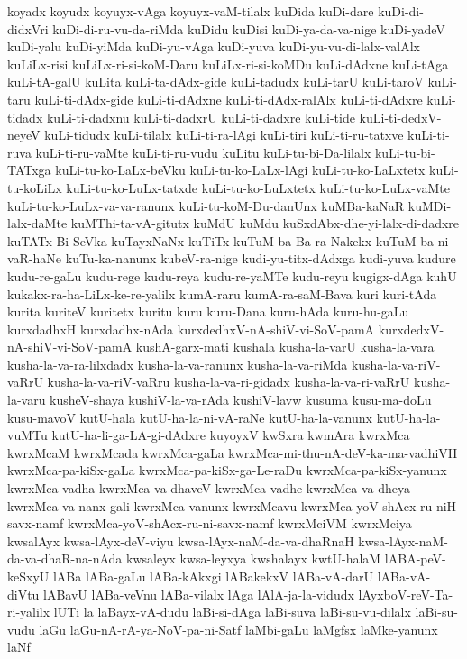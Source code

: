 {koyadx
koyudx
koyuyx-vAga
koyuyx-vaM-tilalx
kuDida
kuDi-dare
kuDi-di-didxVri
kuDi-di-ru-vu-da-riMda
kuDidu
kuDisi
kuDi-ya-da-va-nige
kuDi-yadeV
kuDi-yalu
kuDi-yiMda
kuDi-yu-vAga
kuDi-yuva
kuDi-yu-vu-di-lalx-valAlx
kuLiLx-risi
kuLiLx-ri-si-koM-Daru
kuLiLx-ri-si-koMDu
kuLi-dAdxne
kuLi-tAga
kuLi-tA-galU
kuLita
kuLi-ta-dAdx-gide
kuLi-tadudx
kuLi-tarU
kuLi-taroV
kuLi-taru
kuLi-ti-dAdx-gide
kuLi-ti-dAdxne
kuLi-ti-dAdx-ralAlx
kuLi-ti-dAdxre
kuLi-tidadx
kuLi-ti-dadxnu
kuLi-ti-dadxrU
kuLi-ti-dadxre
kuLi-tide
kuLi-ti-dedxV-neyeV
kuLi-tidudx
kuLi-tilalx
kuLi-ti-ra-lAgi
kuLi-tiri
kuLi-ti-ru-tatxve
kuLi-ti-ruva
kuLi-ti-ru-vaMte
kuLi-ti-ru-vudu
kuLitu
kuLi-tu-bi-Da-lilalx
kuLi-tu-bi-TATxga
kuLi-tu-ko-LaLx-beVku
kuLi-tu-ko-LaLx-lAgi
kuLi-tu-ko-LaLxtetx
kuLi-tu-koLiLx
kuLi-tu-ko-LuLx-tatxde
kuLi-tu-ko-LuLxtetx
kuLi-tu-ko-LuLx-vaMte
kuLi-tu-ko-LuLx-va-va-ranunx
kuLi-tu-koM-Du-danUnx
kuMBa-kaNaR
kuMDi-lalx-daMte
kuMThi-ta-vA-gitutx
kuMdU
kuMdu
kuSxdAbx-dhe-yi-lalx-di-dadxre
kuTATx-Bi-SeVka
kuTayxNaNx
kuTiTx
kuTuM-ba-Ba-ra-Nakekx
kuTuM-ba-ni-vaR-haNe
kuTu-ka-nanunx
kubeV-ra-nige
kudi-yu-titx-dAdxga
kudi-yuva
kudure
kudu-re-gaLu
kudu-rege
kudu-reya
kudu-re-yaMTe
kudu-reyu
kugigx-dAga
kuhU
kukakx-ra-ha-LiLx-ke-re-yalilx
kumA-raru
kumA-ra-saM-Bava
kuri
kuri-tAda
kurita
kuriteV
kuritetx
kuritu
kuru
kuru-Dana
kuru-hAda
kuru-hu-gaLu
kurxdadhxH
kurxdadhx-nAda
kurxdedhxV-nA-shiV-vi-SoV-pamA
kurxdedxV-nA-shiV-vi-SoV-pamA
kushA-garx-mati
kushala
kusha-la-varU
kusha-la-vara
kusha-la-va-ra-lilxdadx
kusha-la-va-ranunx
kusha-la-va-riMda
kusha-la-va-riV-vaRrU
kusha-la-va-riV-vaRru
kusha-la-va-ri-gidadx
kusha-la-va-ri-vaRrU
kusha-la-varu
kusheV-shaya
kushiV-la-va-rAda
kushiV-lavw
kusuma
kusu-ma-doLu
kusu-mavoV
kutU-hala
kutU-ha-la-ni-vA-raNe
kutU-ha-la-vanunx
kutU-ha-la-vuMTu
kutU-ha-li-ga-LA-gi-dAdxre
kuyoyxV
kwSxra
kwmAra
kwrxMca
kwrxMcaM
kwrxMcada
kwrxMca-gaLa
kwrxMca-mi-thu-nA-deV-ka-ma-vadhiVH
kwrxMca-pa-kiSx-gaLa
kwrxMca-pa-kiSx-ga-Le-raDu
kwrxMca-pa-kiSx-yanunx
kwrxMca-vadha
kwrxMca-va-dhaveV
kwrxMca-vadhe
kwrxMca-va-dheya
kwrxMca-va-nanx-gali
kwrxMca-vanunx
kwrxMcavu
kwrxMca-yoV-shAcx-ru-niH-savx-namf
kwrxMca-yoV-shAcx-ru-ni-savx-namf
kwrxMciVM
kwrxMciya
kwsalAyx
kwsa-lAyx-deV-viyu
kwsa-lAyx-naM-da-va-dhaRnaH
kwsa-lAyx-naM-da-va-dhaR-na-nAda
kwsaleyx
kwsa-leyxya
kwshalayx
kwtU-halaM
lABA-peV-keSxyU
lABa
lABa-gaLu
lABa-kAkxgi
lABakekxV
lABa-vA-darU
lABa-vA-diVtu
lABavU
lABa-veVnu
lABa-vilalx
lAga
lAlA-ja-la-vidudx
lAyxboV-reV-Ta-ri-yalilx
lUTi
la
laBayx-vA-dudu
laBi-si-dAga
laBi-suva
laBi-su-vu-dilalx
laBi-su-vudu
laGu
laGu-nA-rA-ya-NoV-pa-ni-Satf
laMbi-gaLu
laMgfsx
laMke-yanunx
laNf
}
